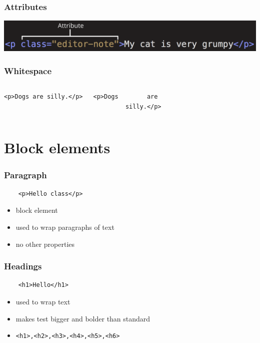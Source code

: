\documentclass{beamer}
\begin{document}
\begin{frame}
  \frametitle{Attributes}
  \begin{center}
    \includegraphics[scale=.25]{attribute.png}
  \end{center}
\end{frame}

\begin{frame}[fragile]
  \frametitle{Whitespace}
  \begin{columns}
    \begin{lstlisting}[basicstyle=\footnotesize]
      <p>Dogs are silly.</p>
    \end{lstlisting}
    \begin{lstlisting}[basicstyle=\footnotesize]
      <p>Dogs        are
         silly.</p>
    \end{lstlisting}
  \end{columns}
\end{frame}

\section[Section]{Block elements}

\begin{frame}[fragile]
  \frametitle{Paragraph}
  \begin{lstlisting}
    <p>Hello class</p>
  \end{lstlisting}
  \begin{itemize}
    \item block element
    \item used to wrap paragraphs of text
    \item no other properties
  \end{itemize}
\end{frame}

\begin{frame}[fragile]
  \frametitle{Headings}
  \begin{lstlisting}
    <h1>Hello</h1>
  \end{lstlisting}
  \begin{itemize}
    \item used to wrap text
    \item makes test bigger and bolder than standard
    \item \begin{lstlisting}[basicstyle=\small]
<h1>,<h2>,<h3>,<h4>,<h5>,<h6>
    \end{lstlisting}
  \end{itemize}
\end{frame}
\end{document}
